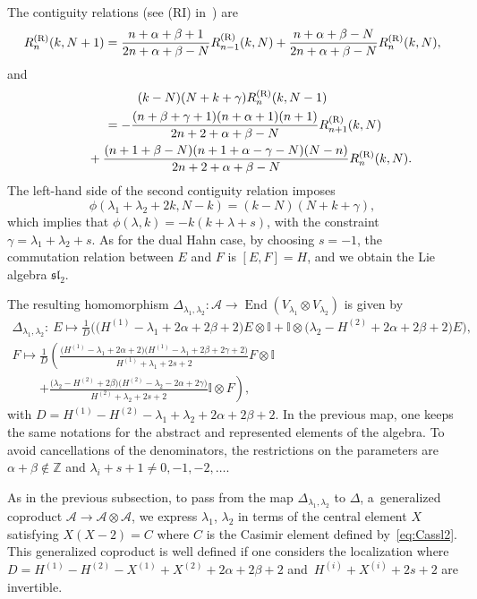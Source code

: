 \documentclass[pdftex]{sigma}
\numberwithin{equation}{section}
\theoremstyle{definition}
\begin{document}
The contiguity relations (see (RI) in~\cite{contiguity}) are
\[
R^{\rm (R)}_n(k,N+1)=\frac{n+\alpha+\beta+1}{2n+\alpha+\beta-N}R^{\rm (R)}_{n-1}(k,N)+\frac{n+\alpha+\beta-N}{2n+\alpha+\beta-N}R^{\rm (R)}_n(k,N),
\]
and
\begin{gather*}
(k-N)(N+k+\gamma)R^{\rm (R)}_n(k,N-1)\\
\qquad=-\frac{(n+\beta+\gamma+1)(n+\alpha+1)(n+1)}{2n+2+\alpha+\beta-N}R^{\rm (R)}_{n+1}(k,N)\\
\phantom{\qquad=}{}+\frac{(n+1+\beta-N)(n+1+\alpha-\gamma-N)(N-n)}{2n+2+\alpha+\beta-N}R^{\rm (R)}_n(k,N).
\end{gather*}
The left-hand side of the second contiguity relation imposes
\[\phi(\lambda_1+\lambda_2+2k,N-k)=(k-N)(N+k+\gamma),\]
which implies that
$\phi(\lambda,k)=-k(k+\lambda+s)$,
 with the constraint
$\gamma=\lambda_1+\lambda_2+s$.
As for the dual Hahn case, by choosing $s=-1$, the commutation relation between $E$ and $F$ is
$[E,F]=H$,
and we obtain the Lie algebra $\mathfrak{sl}_2$.

The resulting homomorphism $\Delta_{\lambda_1,\lambda_2}\colon \mathcal{A} \to \operatorname{End}(V_{\lambda_1}\otimes V_{\lambda_2})$ is given by
\begin{gather*}
\Delta_{\lambda_1,\lambda_2}\colon\ E\mapsto \frac{1}{D}\bigl(\bigl(H^{(1)}-\lambda_1+2\alpha+2\beta+2\bigr)E\otimes \mathbb{I}+\mathbb{I}\otimes \bigl(\lambda_2-H^{(2)}+2\alpha+2\beta+2\bigr)E\bigr),\\
 F\mapsto \frac{1}{D}\left(\frac{\bigl(H^{(1)}-\lambda_1+2\alpha+2\bigr)\bigl(H^{(1)}-\lambda_1+2\beta+2\gamma+2\bigr)}{H^{(1)}+\lambda_1+2s+2}F\otimes \mathbb{I}\right. \\
 \phantom{ F\mapsto }{}\left. +\frac{\bigl(\lambda_2-H^{(2)}+2\beta\bigr)\bigl(H^{(2)}-\lambda_2-2\alpha+2\gamma\bigr)}{H^{(2)}+\lambda_2+2s+2}\mathbb{I}\otimes F\right),\end{gather*}
with $D=H^{(1)}-H^{(2)}-\lambda_1+\lambda_2+2\alpha+2\beta+2$. In the previous map, one keeps the same notations for the abstract and represented elements of the algebra. To avoid cancellations of the denominators, the restrictions on the parameters are $\alpha+\beta\notin\mathbb{Z}$ and $\lambda_i+s+1\neq0,-1,-2,\dots $.

As in the previous subsection, to pass from the map $\Delta_{\lambda_1,\lambda_2}$ to $\Delta$, a~generalized coproduct $\mathcal{A}\to \mathcal{A}\otimes\mathcal{A}$, we express $\lambda_1$, $\lambda_2$ in terms of the central element $X$ satisfying $X(X-2)=C$ where $C$ is the Casimir element defined by~\eqref{eq:Cassl2}. This generalized coproduct is well defined if one considers the localization where $D=H^{(1)}-H^{(2)}-X^{(1)}+X^{(2)}+2\alpha+2\beta+2$ and~${H^{(i)}+X^{(i)}+2s+2}$ are invertible.
\end{document}
